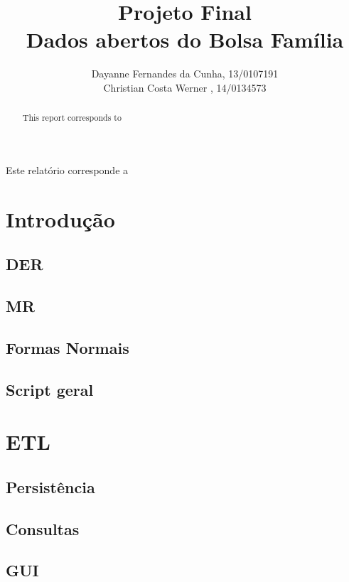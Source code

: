 \documentclass[12pt]{article}
\title{Projeto Final\\ 
	Dados abertos do Bolsa Família}
\author{Dayanne Fernandes da Cunha, 13/0107191\\
	 Christian Costa Werner ,  14/0134573
}
\begin{document}
 
	\maketitle
	
	\begin{abstract}
		This report corresponds to 
	\end{abstract}
	
	\begin{resumo} 
		Este relatório corresponde a
	\end{resumo}
	
	\section{Introdução}
	\label{sec:intro}
	
	\subsection{DER}
	\label{sec:der}
	
	\subsection{MR} 
	\label{sec:mr}

	\subsection{Formas Normais}
	\label{sec:fnormais}
	
	\subsection{Script geral}
	\label{sec:scriptg}
	
	\section{ETL}
	\label{sec:etl}
	
	\subsection{Persistência}
	\label{sec:pers}
	
	\subsection{Consultas} 
	\label{sec:consultas}
	
	\subsection{GUI}
	\label{sec:gui}
	
\end{document}
